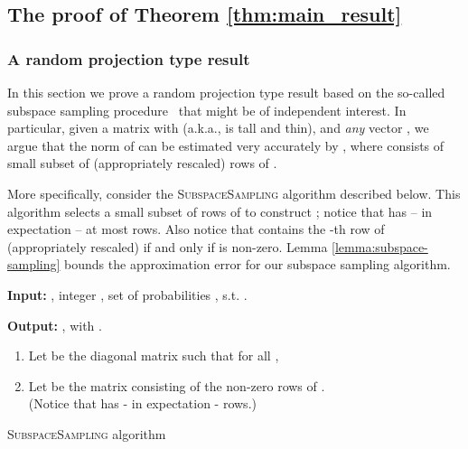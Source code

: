 \documentclass[11pt]{article}
\begin{document}
\subsection{The proof of Theorem \ref{thm:main_result}}

\subsubsection{A random projection type result}
\label{sxn:subspacesampling}

In this section we prove a random projection type result based on the
so-called subspace sampling procedure~\cite{DMM07} that might be
of independent interest. In particular, given a matrix  with  (a.k.a.,  is tall
and thin), and \textit{any} vector , we argue
that the  norm of  can be estimated very
accurately by , where  consists of
small subset of (appropriately rescaled) rows of .

More specifically, consider the \textsc{SubspaceSampling}
algorithm described below. This algorithm selects a small subset
of rows of  to construct ; notice that
 has -- in expectation -- at most  rows. Also
notice that  contains the -th row of 
(appropriately rescaled) if and only if  is non-zero.
Lemma \ref{lemma:subspace-sampling} bounds the approximation error
for our subspace sampling algorithm.

\begin{algorithm}[h]
\begin{framed}

\textbf{Input:} , integer , set of probabilities ,  s.t. .

\textbf{Output:} , with .

\vspace{0.1in}

\begin{enumerate}
\item Let  be the  diagonal matrix such that for all ,
    
\item Let  be the matrix consisting of the non-zero rows of
    . \\ (Notice that  has - in expectation -  rows.)
\end{enumerate}
\end{framed}
\caption{\textsc{SubspaceSampling} algorithm} \label{alg:alg2}
\end{algorithm}
\end{document}
